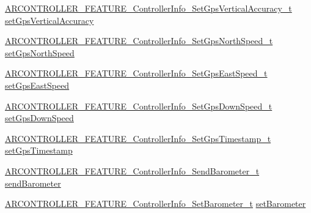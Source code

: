 \begin{DoxyCompactItemize}
\hyperlink{_a_r_c_o_n_t_r_o_l_l_e_r___feature_8h_acb1224ce9a58ba4a10d1bd3793e881fb}{A\+R\+C\+O\+N\+T\+R\+O\+L\+L\+E\+R\+\_\+\+F\+E\+A\+T\+U\+R\+E\+\_\+\+Controller\+Info\+\_\+\+Set\+Gps\+Vertical\+Accuracy\+\_\+t} \hyperlink{struct_a_r_c_o_n_t_r_o_l_l_e_r___f_e_a_t_u_r_e___controller_info__t_a29fbeb31a13093ddfb98f5af389f9f1e}{set\+Gps\+Vertical\+Accuracy}
\item 
\hyperlink{_a_r_c_o_n_t_r_o_l_l_e_r___feature_8h_acd1b9c9ebb0708c614c6a32f47c48e4e}{A\+R\+C\+O\+N\+T\+R\+O\+L\+L\+E\+R\+\_\+\+F\+E\+A\+T\+U\+R\+E\+\_\+\+Controller\+Info\+\_\+\+Set\+Gps\+North\+Speed\+\_\+t} \hyperlink{struct_a_r_c_o_n_t_r_o_l_l_e_r___f_e_a_t_u_r_e___controller_info__t_a9489637cedb896816302b83fb557c1a8}{set\+Gps\+North\+Speed}
\item 
\hyperlink{_a_r_c_o_n_t_r_o_l_l_e_r___feature_8h_a83050117188afe293bcf5e4dba6ad1b3}{A\+R\+C\+O\+N\+T\+R\+O\+L\+L\+E\+R\+\_\+\+F\+E\+A\+T\+U\+R\+E\+\_\+\+Controller\+Info\+\_\+\+Set\+Gps\+East\+Speed\+\_\+t} \hyperlink{struct_a_r_c_o_n_t_r_o_l_l_e_r___f_e_a_t_u_r_e___controller_info__t_ae326f4a92516f1a8c76bf45666bac188}{set\+Gps\+East\+Speed}
\item 
\hyperlink{_a_r_c_o_n_t_r_o_l_l_e_r___feature_8h_aea7951847fb7945d2e960e68d4f7d4a1}{A\+R\+C\+O\+N\+T\+R\+O\+L\+L\+E\+R\+\_\+\+F\+E\+A\+T\+U\+R\+E\+\_\+\+Controller\+Info\+\_\+\+Set\+Gps\+Down\+Speed\+\_\+t} \hyperlink{struct_a_r_c_o_n_t_r_o_l_l_e_r___f_e_a_t_u_r_e___controller_info__t_a88af1192dc4775cd6721da8020061fc4}{set\+Gps\+Down\+Speed}
\item 
\hyperlink{_a_r_c_o_n_t_r_o_l_l_e_r___feature_8h_a9c7db58872f5c3da3576d6bc1f0a5dcb}{A\+R\+C\+O\+N\+T\+R\+O\+L\+L\+E\+R\+\_\+\+F\+E\+A\+T\+U\+R\+E\+\_\+\+Controller\+Info\+\_\+\+Set\+Gps\+Timestamp\+\_\+t} \hyperlink{struct_a_r_c_o_n_t_r_o_l_l_e_r___f_e_a_t_u_r_e___controller_info__t_a888ea4a01414a3d48d540a9986355dbb}{set\+Gps\+Timestamp}
\item 
\hyperlink{_a_r_c_o_n_t_r_o_l_l_e_r___feature_8h_af736c348c9b1287ca4974285e031b754}{A\+R\+C\+O\+N\+T\+R\+O\+L\+L\+E\+R\+\_\+\+F\+E\+A\+T\+U\+R\+E\+\_\+\+Controller\+Info\+\_\+\+Send\+Barometer\+\_\+t} \hyperlink{struct_a_r_c_o_n_t_r_o_l_l_e_r___f_e_a_t_u_r_e___controller_info__t_aa0da1f0c3e6b0294d405aa5dc94c3de2}{send\+Barometer}
\item 
\hyperlink{_a_r_c_o_n_t_r_o_l_l_e_r___feature_8h_a7d2dd9084f4afb286c815c7e0eb7a459}{A\+R\+C\+O\+N\+T\+R\+O\+L\+L\+E\+R\+\_\+\+F\+E\+A\+T\+U\+R\+E\+\_\+\+Controller\+Info\+\_\+\+Set\+Barometer\+\_\+t} \hyperlink{struct_a_r_c_o_n_t_r_o_l_l_e_r___f_e_a_t_u_r_e___controller_info__t_a86a081d39db239a1328ed20ef1dd07ca}{set\+Barometer}

\end{DoxyCompactItemize}
